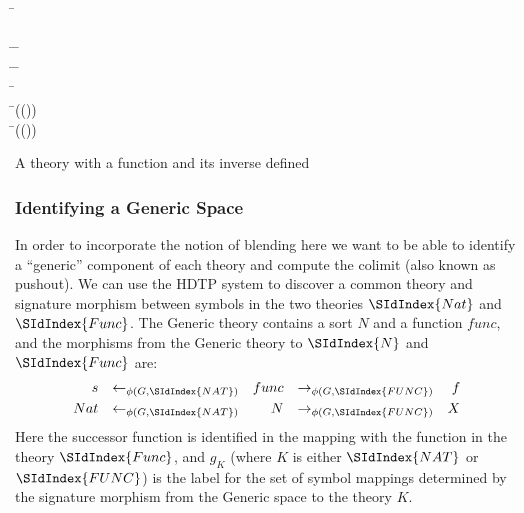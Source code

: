 \begin{listing}[!ht]
\begin{mdframed}
\begin{hetcasl}
\SPEC \= \Ax{=}\\
\> \SORT {}\\
\> \OP \= \Ax{:} \= \Ax{\rightarrow} \\
\> \OP \= \Ax{:} \= \Ax{\rightarrow} \\
\> \Ax{\forall} \= \Ax{:}  \\
\> \Ax{\bullet} \=(()) \Ax{=} \\
\> \Ax{\bullet} \=(()) \Ax{=} \\
\end{hetcasl}
\end{mdframed}
\caption{A theory with a function and its inverse defined}
\label{fig:inv}
\end{listing}



\subsubsection{Identifying a Generic Space}
In order to incorporate the notion of blending here we want to be able
to identify a ``generic'' component of each theory and compute the
colimit (also known as pushout).
We can use the
HDTP system \parencite{GustKS2006,Schmidt2010} to discover a common theory
and signature morphism between symbols in the
two theories $\SIdIndex{Nat}$ and $\SIdIndex{Func}$. The Generic theory
contains a sort $N$ and a function $func$, and the morphisms from the
Generic theory to $\SIdIndex{N}$ and $\SIdIndex{Func}$ are:
\begin{align}
s&&\leftarrow_{\phi(G,\SIdIndex{NAT})}&&func&&\rightarrow_{\phi(G,\SIdIndex{FUNC})}&&f\\
Nat&&\leftarrow_{\phi(G,\SIdIndex{NAT})}&&N&&\rightarrow_{\phi(G,\SIdIndex{FUNC})}&&X
\end{align}
Here the successor function is identified in the mapping with the
function in the theory $\SIdIndex{Func}$, and $g_K$ (where $K$ is either
$\SIdIndex{NAT}$ or $\SIdIndex{FUNC}$) is the label for
the set of symbol mappings determined by the signature morphism from
the Generic space to the theory $K$.

